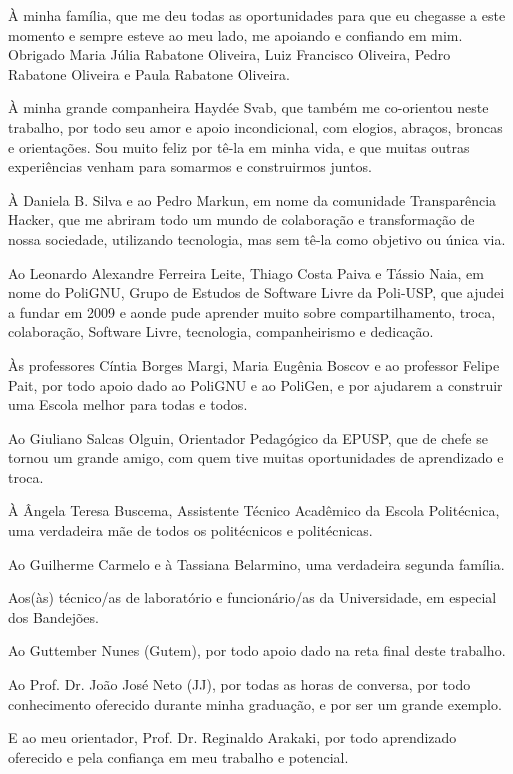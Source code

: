 À minha família, que me deu todas as oportunidades para que eu chegasse a este momento e sempre esteve ao meu lado, me apoiando e confiando em mim. Obrigado Maria Júlia Rabatone Oliveira, Luiz Francisco Oliveira, Pedro Rabatone Oliveira e Paula Rabatone Oliveira.

À minha grande companheira Haydée Svab, que também me co-orientou neste trabalho, por todo seu amor e apoio incondicional, com elogios, abraços, broncas e orientações. Sou muito feliz por tê-la em minha vida, e que muitas outras experiências venham para somarmos e construirmos juntos.

À Daniela B. Silva e ao Pedro Markun, em nome da comunidade Transparência\\
Hacker, que me abriram todo um mundo de colaboração e transformação de nossa sociedade, utilizando tecnologia, mas sem tê-la como objetivo ou única via.

Ao Leonardo Alexandre Ferreira Leite, Thiago Costa Paiva e Tássio Naia, em nome do PoliGNU, Grupo de Estudos de Software Livre da Poli-USP, que ajudei a fundar em 2009 e aonde pude aprender muito sobre compartilhamento, troca, colaboração, Software Livre, tecnologia, companheirismo e dedicação.

Às professores Cíntia Borges Margi, Maria Eugênia Boscov e ao professor Felipe Pait, por todo apoio dado ao PoliGNU e ao PoliGen, e por ajudarem a construir uma Escola melhor para todas e todos.

Ao Giuliano Salcas Olguin, Orientador Pedagógico da EPUSP, que de chefe se tornou um grande amigo, com quem tive muitas oportunidades de aprendizado e troca.

À Ângela Teresa Buscema, Assistente Técnico Acadêmico da Escola Politécnica, uma verdadeira mãe de todos os politécnicos e politécnicas.

Ao Guilherme Carmelo e à Tassiana Belarmino, uma verdadeira segunda família.

Aos(às) técnico/as de laboratório e funcionário/as da Universidade, em especial dos Bandejões.

Ao Guttember Nunes (Gutem), por todo apoio dado na reta final deste trabalho.

Ao Prof. Dr. João José Neto (JJ), por todas as horas de conversa, por todo conhecimento oferecido durante minha graduação, e por ser um grande exemplo.

E ao meu orientador, Prof. Dr. Reginaldo Arakaki, por todo aprendizado oferecido e pela confiança em meu trabalho e potencial.